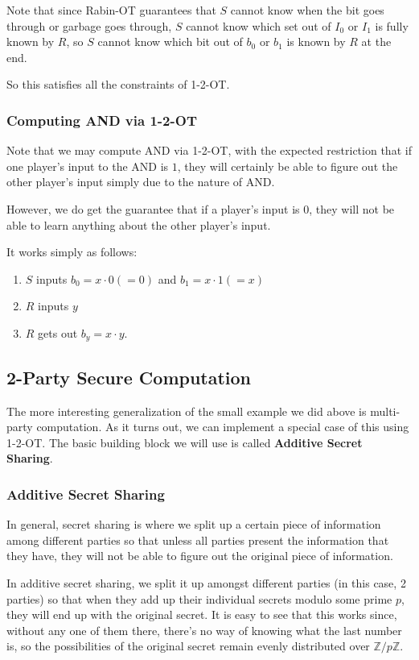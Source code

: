 \documentclass[11pt]{article}
\newcommand{\Z}{\mathbb{Z}}
\newcommand{\tb}{\textbf}
\begin{document}
Note that since Rabin-OT guarantees that \(S\) cannot know when the bit goes through or garbage goes through,
\(S\) cannot know which set out of \(I_0\) or \(I_1\) is fully known by \(R\),
so \(S\) cannot know which bit out of \(b_0\) or \(b_1\) is known by \(R\) at the end.

So this satisfies all the constraints of 1-2-OT.

\subsubsection{Computing AND via 1-2-OT}
Note that we may compute AND via 1-2-OT,
with the expected restriction that if one player's input to the AND is \(1\),
they will certainly be able to figure out the other player's input simply due to the nature of AND.

However, we do get the guarantee that if a player's input is \(0\),
they will not be able to learn anything about the other player's input.

It works simply as follows: 
\begin{enumerate}
\item \(S\) inputs \(b_0 = x\cdot 0 (=0)\) and \(b_1=x\cdot 1 ( = x)\)
\item \(R\) inputs \(y\)
\item \(R\) gets out \(b_y = x\cdot y\).
\end{enumerate}

\newpage
\subsection{2-Party Secure Computation}
The more interesting generalization of the small example we did above is multi-party computation.
As it turns out, we can implement a special case of this using 1-2-OT.
The basic building block we will use is called \tb{Additive Secret Sharing}.

\subsubsection{Additive Secret Sharing}
In general, secret sharing is where we split up a certain piece of information among different parties
so that unless all parties present the information that they have,
they will not be able to figure out the original piece of information.

In additive secret sharing, we split it up amongst different parties (in this case, 2 parties)
so that when they add up their individual secrets modulo some prime \(p\),
they will end up with the original secret.
It is easy to see that this works since, without any one of them there,
there's no way of knowing what the last number is,
so the possibilities of the original secret remain evenly distributed over \(\Z/p\Z\).
\end{document}
